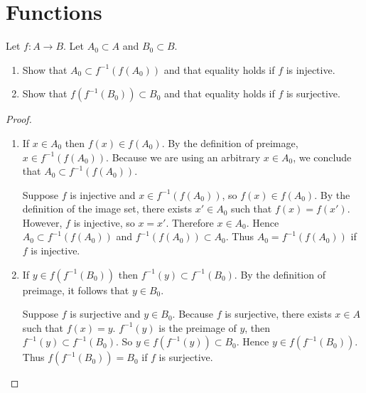 \section{Functions}

\begin{exercise}\label{chapter1:section2:exercise1}
    Let $f: A\to B$. Let $A_{0}\subset A$ and $B_{0}\subset B$.
    \begin{enumerate}[label={(\alph*)}]
        \item Show that $A_{0}\subset f^{-1}(f(A_{0}))$ and that equality holds if $f$ is injective.
        \item Show that $f(f^{-1}(B_{0}))\subset B_{0}$ and that equality holds if $f$ is surjective.
    \end{enumerate}
\end{exercise}

\begin{proof}
    \begin{enumerate}[label={(\alph*)}]
        \item If $x\in A_{0}$ then $f(x)\in f(A_{0})$. By the definition of preimage, $x\in f^{-1}(f(A_{0}))$. Because we are using an arbitrary $x\in A_{0}$, we conclude that $A_{0}\subset f^{-1}(f(A_{0}))$.

              Suppose $f$ is injective and $x\in f^{-1}(f(A_{0}))$, so $f(x)\in f(A_{0})$. By the definition of the image set, there exists $x'\in A_{0}$ such that $f(x) = f(x')$. However, $f$ is injective, so $x = x'$. Therefore $x\in A_{0}$. Hence $A_{0}\subset f^{-1}(f(A_{0}))$ and $f^{-1}(f(A_{0}))\subset A_{0}$. Thus $A_{0} = f^{-1}(f(A_{0}))$ if $f$ is injective.
        \item If $y\in f(f^{-1}(B_{0}))$ then $f^{-1}(y) \subset f^{-1}(B_{0})$. By the definition of preimage, it follows that $y\in B_{0}$.

              Suppose $f$ is surjective and $y\in B_{0}$. Because $f$ is surjective, there exists $x\in A$ such that $f(x) = y$. $f^{-1}(y)$ is the preimage of $y$, then $f^{-1}(y)\subset f^{-1}(B_{0})$. So $y\in f(f^{-1}(y))\subset B_{0}$. Hence $y\in f(f^{-1}(B_{0}))$. Thus $f(f^{-1}(B_{0})) = B_{0}$ if $f$ is surjective.
    \end{enumerate}
\end{proof}


